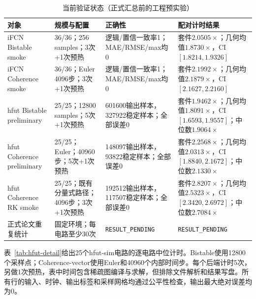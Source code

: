 \documentclass[UTF8,a4paper,11pt]{ctexart}
\newcommand{\pending}{\texttt{RESULT\_PENDING}}
\begin{document}
\begin{table}[H]
\centering
\caption{当前验证状态（正式汇总前的工程预实验）}
\label{tab:status}
\small
\begin{tabular}{@{}p{2.8cm}p{4.0cm}p{3.7cm}p{4.5cm}@{}}
\toprule
对象 & 规模与配置 & 正确性 & 配对计时结果\\
\midrule
iFCN Bistable smoke & 36/36；256 samples；3次+1次预热 & 逻辑/置信一致率1；MAE/RMSE/max均0 & 套件$2.0505\times$；几何均值$1.8730\times$，CI $[1.8214,1.9326]$\\
iFCN Coherence smoke & 36/36；Euler 4096步；3次+1次预热 & 逻辑/置信一致率1；MAE/RMSE/max均0 & 套件$2.1992\times$；几何均值$2.1879\times$，CI $[2.1627,2.2160]$\\
hfut Bistable preliminary & 25/25；12800 samples；5次+1次预热 & 601600输出样本，327922稳定样本；全部误差0 & 套件$1.9462\times$；几何均值$1.8091\times$，CI $[1.6593,1.9557]$；中位数$1.9064\times$\\
hfut Coherence preliminary & 25/25；Euler；40960步；5次+1次预热 & 148097输出样本，93822稳定样本；全部误差0 & 套件$2.2568\times$；几何均值$2.0313\times$，CI $[1.8840,2.1672]$；中位数$2.1330\times$\\
hfut Coherence RK smoke & 25/25；既有分量式路径；4096步；3次+1次预热 & 192512输出样本，117507稳定样本；全部误差0 & 套件$2.8207\times$；几何均值$2.5323\times$，CI $[2.3420,2.6972]$；中位数$2.7084\times$\\
正式论文重复统计 & 固定环境；每电路至少30次 & \pending & \pending\\
\bottomrule
\end{tabular}
\end{table}

表~\ref{tab:hfut-detail}给出25个hfut-sim电路的逐电路中位计时。Bistable使用12800个采样点；Coherence-vector使用Euler和40960个内部时间步。每个后端计时5次，另做1次预热，表中时间包含稀疏图编译与求解，但排除文件解析和结果写盘。所有行的输入、时钟、输出标签和采样网格均通过公平性检查，输出最大绝对误差均为0。
\end{document}
